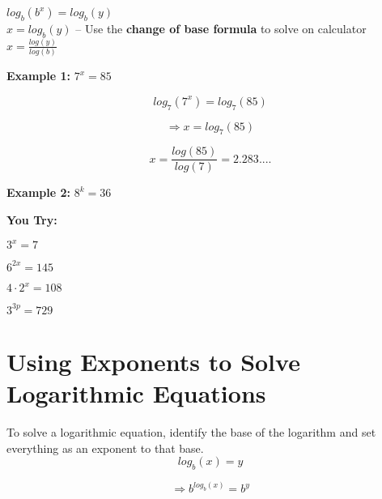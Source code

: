 \documentclass[12pt]{article}
\begin{document}
$log_{b} \left( b^{x} \right) = log_{b}(y)$\\

$x=log_{b}(y)$ -- Use the \textbf{change of base formula} to solve on calculator\\

$x=\frac{log(y)}{log(b)}$\\

\hrulefill

\textbf{Example 1:} $7^{x}=85$ 

$$log_{7} \left( 7^{x} \right) = log_{7}(85)$$

$$\Rightarrow x=log_{7}(85)$$ 

$$x=\frac{log(85)}{log(7)}=2.283....$$

\textbf{Example 2:} $8^{k}=36$\\

\vspace{1in}

\hrulefill

\textbf{You Try:}\\

\begin{enumerate}
	\setlength\itemsep{1.5cm}
\begin{multicols}{2}

\item $3^x=7$\\

\item $6^{2x}=145$\\

\item $4 \cdot 2^x=108$\\

\item $3^{3p}=729$\\

\end{multicols}
\end{enumerate}



\section{Using Exponents to Solve Logarithmic Equations}

To solve a logarithmic equation, identify the base of the logarithm and set everything as an exponent to that base.\\

$$log_{b}(x)=y$$

$$\Rightarrow b^{log_{b}(x)}=b^y$$
\end{document}
